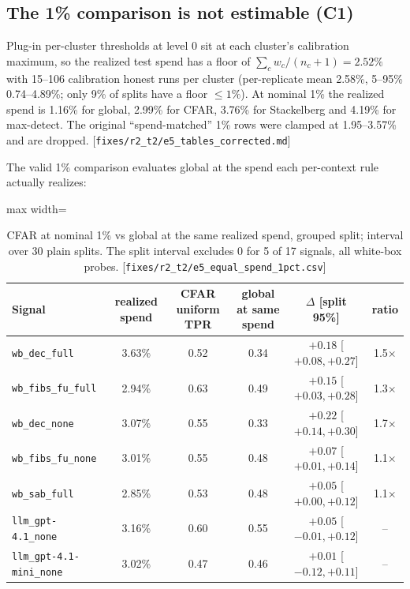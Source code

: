 \documentclass[11pt]{article}
\newcommand{\src}[1]{{\footnotesize\textcolor{ink2}{[\nolinkurl{#1}]}}}
\begin{document}
\subsection{The 1\% comparison is not estimable (C1)}
Plug-in per-cluster thresholds at level 0 sit at each cluster's calibration maximum, so the realized test spend has a floor of $\sum_c w_c/(n_c+1)=2.52\%$ with 15--106 calibration honest runs per cluster (per-replicate mean 2.58\%, 5--95\% 0.74--4.89\%; only 9\% of splits have a floor $\le1\%$). At nominal 1\% the realized spend is 1.16\% for global, 2.99\% for CFAR, 3.76\% for Stackelberg and 4.19\% for max-detect. The original ``spend-matched'' 1\% rows were clamped at 1.95--3.57\% and are dropped. \src{fixes/r2_t2/e5_tables_corrected.md}

The valid 1\% comparison evaluates global at the spend each per-context rule actually realizes:
\begin{table}[!htb]\centering\small
\begin{adjustbox}{max width=\linewidth}\begin{tabular}{@{}lccccc@{}}
\toprule
Signal & realized spend & CFAR uniform TPR & global at same spend & $\Delta$ [split 95\%] & ratio\\
\midrule
\texttt{wb\_dec\_full} & 3.63\% & 0.52 & 0.34 & $+0.18$ [$+0.08,+0.27$] & 1.5$\times$\\
\texttt{wb\_fibs\_fu\_full} & 2.94\% & 0.63 & 0.49 & $+0.15$ [$+0.03,+0.28$] & 1.3$\times$\\
\texttt{wb\_dec\_none} & 3.07\% & 0.55 & 0.33 & $+0.22$ [$+0.14,+0.30$] & 1.7$\times$\\
\texttt{wb\_fibs\_fu\_none} & 3.01\% & 0.55 & 0.48 & $+0.07$ [$+0.01,+0.14$] & 1.1$\times$\\
\texttt{wb\_sab\_full} & 2.85\% & 0.53 & 0.48 & $+0.05$ [$+0.00,+0.12$] & 1.1$\times$\\
\texttt{llm\_gpt-4.1\_none} & 3.16\% & 0.60 & 0.55 & $+0.05$ [$-0.01,+0.12$] & --\\
\texttt{llm\_gpt-4.1-mini\_none} & 3.02\% & 0.47 & 0.46 & $+0.01$ [$-0.12,+0.11$] & --\\
\bottomrule
\end{tabular}\end{adjustbox}
\caption{CFAR at nominal 1\% vs global at the same realized spend, grouped split; interval over 30 plain splits. The split interval excludes 0 for 5 of 17 signals, all white-box probes. \src{fixes/r2_t2/e5_equal_spend_1pct.csv}}
\end{table}
\end{document}
